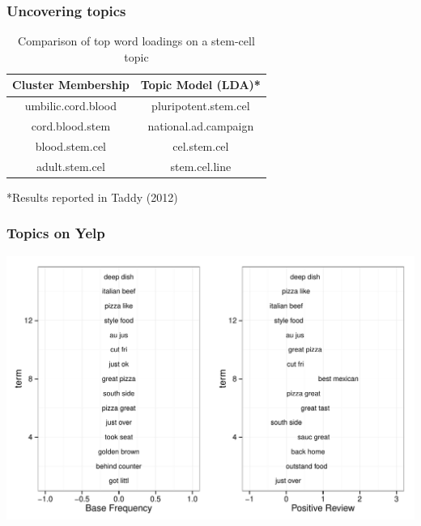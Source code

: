 \documentclass[presentation]{beamer}
\begin{document}
\begin{frame}
\frametitle{Uncovering topics}
\begin{table}[!htbp]
\caption{Comparison of top word loadings on a stem-cell topic} \label{tab:title}
\centering
\begin{tabular}{  c  c }
Cluster Membership & Topic Model (LDA)* \\
\hline
umbilic.cord.blood & pluripotent.stem.cel \\
cord.blood.stem  & national.ad.campaign \\
blood.stem.cel   & cel.stem.cel \\
adult.stem.cel & stem.cel.line \\
\end{tabular}
\end{table}
\pause
*Results reported in Taddy (2012)
\end{frame}



\begin{frame}
\frametitle{Topics on Yelp} %
\begin{center}
\includegraphics[width=1\textwidth]{Images/we8there_distortion.pdf}
\end{center}
\end{frame}
\end{document}
